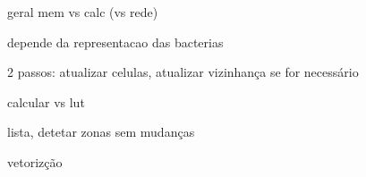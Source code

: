 


geral mem vs calc (vs rede)

depende da representacao das bacterias

2 passos: atualizar celulas, atualizar vizinhança se for necessário

calcular vs lut

lista, detetar zonas sem mudanças

vetorizção 

